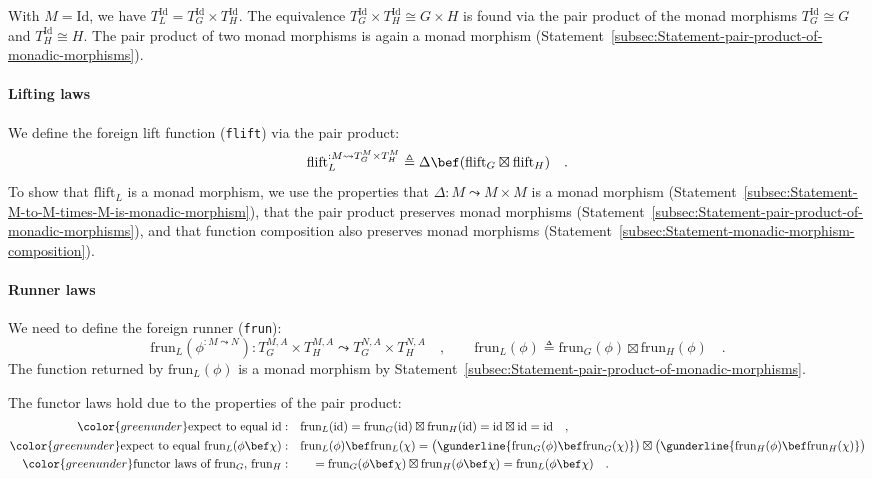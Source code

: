 With $M=\text{Id}$, we have $T_{L}^{\text{Id}}=T_{G}^{\text{Id}}\times T_{H}^{\text{Id}}$.
The equivalence $T_{G}^{\text{Id}}\times T_{H}^{\text{Id}}\cong G\times H$
is found via the pair product of the monad morphisms $T_{G}^{\text{Id}}\cong G$
and $T_{H}^{\text{Id}}\cong H$. The pair product of two monad morphisms
is again a monad morphism (Statement~\ref{subsec:Statement-pair-product-of-monadic-morphisms}).

\paragraph{Lifting laws}

We define the foreign lift function (\lstinline!flift!) via the pair
product:
\[
\text{flift}_{L}^{:M\leadsto T_{G}^{M}\times T_{H}^{M}}\triangleq\Delta\bef(\text{flift}_{G}\boxtimes\text{flift}_{H})\quad.
\]
To show that $\text{flift}_{L}$ is a monad morphism, we use the properties
that $\Delta:M\leadsto M\times M$ is a monad morphism (Statement~\ref{subsec:Statement-M-to-M-times-M-is-monadic-morphism}),
that the pair product preserves monad morphisms (Statement~\ref{subsec:Statement-pair-product-of-monadic-morphisms}),
and that function composition also preserves monad morphisms (Statement~\ref{subsec:Statement-monadic-morphism-composition}).

\paragraph{Runner laws}

We need to define the foreign runner (\lstinline!frun!):
\[
\text{frun}_{L}(\phi^{:M\leadsto N}):T_{G}^{M,A}\times T_{H}^{M,A}\leadsto T_{G}^{N,A}\times T_{H}^{N,A}\quad,\quad\quad\text{frun}_{L}(\phi)\triangleq\text{frun}_{G}(\phi)\boxtimes\text{frun}_{H}(\phi)\quad.
\]
The function returned by $\text{frun}_{L}(\phi)$ is a monad morphism
by Statement~\ref{subsec:Statement-pair-product-of-monadic-morphisms}.

The functor laws hold due to the properties of the pair product:
\begin{align*}
{\color{greenunder}\text{expect to equal }\text{id}:}\quad & \text{frun}_{L}(\text{id})=\text{frun}_{G}(\text{id})\boxtimes\text{frun}_{H}(\text{id})=\text{id}\boxtimes\text{id}=\text{id}\quad,\\
{\color{greenunder}\text{expect to equal }\text{frun}_{L}(\phi\bef\chi):}\quad & \text{frun}_{L}(\phi)\bef\text{frun}_{L}(\chi)=\big(\gunderline{\text{frun}_{G}(\phi)\bef\text{frun}_{G}(\chi)}\big)\boxtimes\big(\gunderline{\text{frun}_{H}(\phi)\bef\text{frun}_{H}(\chi)}\big)\\
{\color{greenunder}\text{functor laws of }\text{frun}_{G},\,\text{frun}_{H}:}\quad & \quad=\text{frun}_{G}(\phi\bef\chi)\boxtimes\text{frun}_{H}(\phi\bef\chi)=\text{frun}_{L}(\phi\bef\chi)\quad.
\end{align*}


